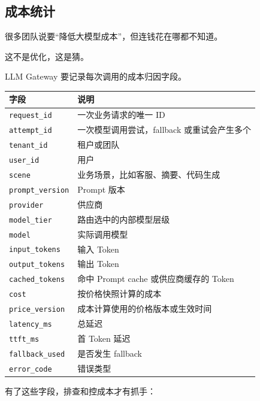 \documentclass[9pt,a4paper,twocolumn]{ctexart}
\begin{document}
\subsection*{成本统计}


很多团队说要“降低大模型成本”，但连钱花在哪都不知道。



这不是优化，这是猜。



LLM Gateway 要记录每次调用的成本归因字段。


{\footnotesize
\begin{tabular}{|p{}|p{}|}
\hline
\textbf{字段} & \textbf{说明} \\
\hline
\texttt{request\_id} & 一次业务请求的唯一 ID \\
\hline
\texttt{attempt\_id} & 一次模型调用尝试，fallback 或重试会产生多个 \\
\hline
\texttt{tenant\_id} & 租户或团队 \\
\hline
\texttt{user\_id} & 用户 \\
\hline
\texttt{scene} & 业务场景，比如客服、摘要、代码生成 \\
\hline
\texttt{prompt\_version} & Prompt 版本 \\
\hline
\texttt{provider} & 供应商 \\
\hline
\texttt{model\_tier} & 路由选中的内部模型层级 \\
\hline
\texttt{model} & 实际调用模型 \\
\hline
\texttt{input\_tokens} & 输入 Token \\
\hline
\texttt{output\_tokens} & 输出 Token \\
\hline
\texttt{cached\_tokens} & 命中 Prompt cache 或供应商缓存的 Token \\
\hline
\texttt{cost} & 按价格快照计算的成本 \\
\hline
\texttt{price\_version} & 成本计算使用的价格版本或生效时间 \\
\hline
\texttt{latency\_ms} & 总延迟 \\
\hline
\texttt{ttft\_ms} & 首 Token 延迟 \\
\hline
\texttt{fallback\_used} & 是否发生 fallback \\
\hline
\texttt{error\_code} & 错误类型 \\
\hline
\end{tabular}
}



有了这些字段，排查和控成本才有抓手：
\end{document}

